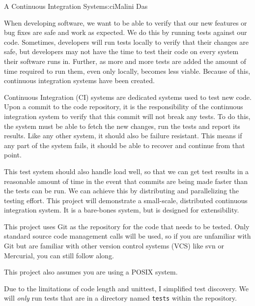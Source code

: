 \begin{aosachapter}{A Continuous Integration System}{s:ci}{Malini Das}

\label{what-is-a-continuous-integration-system}

When developing software, we want to be able to verify that our new
features or bug fixes are safe and work as expected. We do this by
running tests against our code. Sometimes, developers will run tests
locally to verify that their changes are safe, but developers may not
have the time to test their code on every system their software runs in.
Further, as more and more tests are added the amount of time required to
run them, even only locally, becomes less viable. Because of this,
continuous integration systems have been created.

Continuous Integration (CI) systems are dedicated systems used to test
new code. Upon a commit to the code repository, it is the responsibility
of the continuous integration system to verify that this commit will not
break any tests. To do this, the system must be able to fetch the new
changes, run the tests and report its results. Like any other system, it
should also be failure resistant. This means if any part of the system
fails, it should be able to recover and continue from that point.

This test system should also handle load well, so that we can get test
results in a reasonable amount of time in the event that commits are
being made faster than the tests can be run. We can achieve this by
distributing and parallelizing the testing effort. This project will
demonstrate a small-scale, distributed continuous integration system. It
is a bare-bones system, but is designed for extensibility.

\label{project-limitations-and-notes}

This project uses Git as the repository for the code that needs to be
tested. Only standard source code management calls will be used, so if
you are unfamiliar with Git but are familiar with other version control
systems (VCS) like svn or Mercurial, you can still follow along.

This project also assumes you are using a POSIX system.

Due to the limitations of code length and unittest, I simplified test
discovery. We will \emph{only} run tests that are in a directory named
\texttt{tests} within the repository.


\end{aosachapter}
